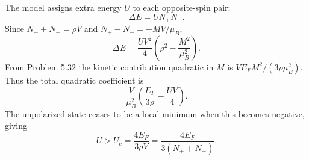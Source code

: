 The model assigns extra energy $U$ to
each opposite-spin pair:
\begin{equation}
\Delta E=UN_+N_-.
\end{equation}
Since $N_++N_-=\rho V$ and
$N_+-N_-=-MV/\mu_B$,
\begin{equation}
\boxed{\Delta E=
\frac{UV^2}{4}
\left(\rho^2-\frac{M^2}{\mu_B^2}\right)}.
\end{equation}
From Problem 5.32 the kinetic
contribution quadratic in $M$ is
$V E_F M^2/(3\rho\mu_B^2)$.
Thus the total quadratic coefficient is
\begin{equation}
\frac{V}{\mu_B^2}
\left(\frac{E_F}{3\rho}
-\frac{UV}{4}\right).
\end{equation}
The unpolarized state ceases to be a local
minimum when this becomes negative, giving
\begin{equation}
\boxed{U>U_c=\frac{4E_F}{3\rho V}
=\frac{4E_F}{3(N_++N_-)}}.
\end{equation}
